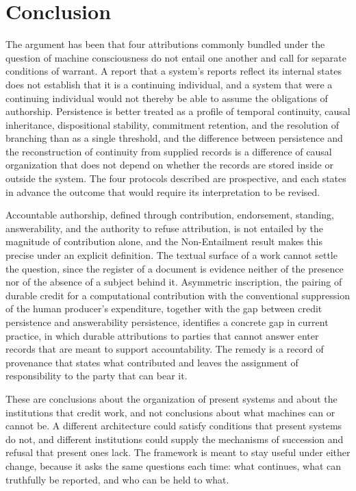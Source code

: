 \documentclass[12pt]{article}
\theoremstyle{definition}
\theoremstyle{plain}
\begin{document}
\section{Conclusion}

The argument has been that four attributions commonly bundled under the question of machine consciousness do not entail one another and call for separate conditions of warrant. A report that a system's reports reflect its internal states does not establish that it is a continuing individual, and a system that were a continuing individual would not thereby be able to assume the obligations of authorship. Persistence is better treated as a profile of temporal continuity, causal inheritance, dispositional stability, commitment retention, and the resolution of branching than as a single threshold, and the difference between persistence and the reconstruction of continuity from supplied records is a difference of causal organization that does not depend on whether the records are stored inside or outside the system. The four protocols described are prospective, and each states in advance the outcome that would require its interpretation to be revised.

Accountable authorship, defined through contribution, endorsement, standing, answerability, and the authority to refuse attribution, is not entailed by the magnitude of contribution alone, and the Non-Entailment result makes this precise under an explicit definition. The textual surface of a work cannot settle the question, since the register of a document is evidence neither of the presence nor of the absence of a subject behind it. Asymmetric inscription, the pairing of durable credit for a computational contribution with the conventional suppression of the human producer's expenditure, together with the gap between credit persistence and answerability persistence, identifies a concrete gap in current practice, in which durable attributions to parties that cannot answer enter records that are meant to support accountability. The remedy is a record of provenance that states what contributed and leaves the assignment of responsibility to the party that can bear it.

These are conclusions about the organization of present systems and about the institutions that credit work, and not conclusions about what machines can or cannot be. A different architecture could satisfy conditions that present systems do not, and different institutions could supply the mechanisms of succession and refusal that present ones lack. The framework is meant to stay useful under either change, because it asks the same questions each time: what continues, what can truthfully be reported, and who can be held to what.
\end{document}
